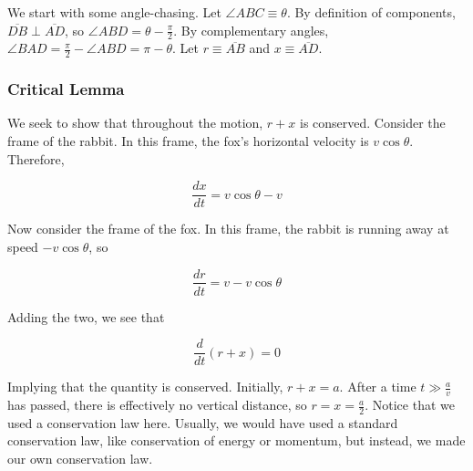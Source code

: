 \documentclass[11pt]{scrartcl}
\begin{document}
We start with some angle-chasing.
Let $\angle ABC \equiv \theta$.
By definition of components, $\overline{DB} \perp \overline{AD}$, so $\angle ABD = \theta - \frac{\pi}{2}$.
By complementary angles, $\angle BAD = \frac{\pi}{2} - \angle ABD = \pi - \theta $.
Let $r \equiv \overline{AB}$ and $x \equiv \overline{AD}$.

\subsubsection{Critical Lemma}

We seek to show that throughout the motion, $r+x$ is conserved.
Consider the frame of the rabbit.
In this frame, the fox's horizontal velocity is $ v \cos{\theta}$.
Therefore,

$$\frac{dx}{dt} = v \cos{\theta} - v$$

Now consider the frame of the fox.
In this frame, the rabbit is running away at speed $- v \cos{\theta}$, so

$$ \frac{dr}{dt} = v - v \cos{\theta} $$

Adding the two, we see that

$$\frac{d}{dt} \left (r+x \right) = 0$$

Implying that the quantity is conserved.
Initially, $r+x = a$. After a time $t \gg \frac{a}{v}$ has passed, there is effectively no vertical distance, so $r = x = \frac{a}{2}$.
Notice that we used a conservation law here. Usually, we would have used a standard conservation law, like conservation of energy or momentum, but instead, we made our own conservation law.
\end{document}
